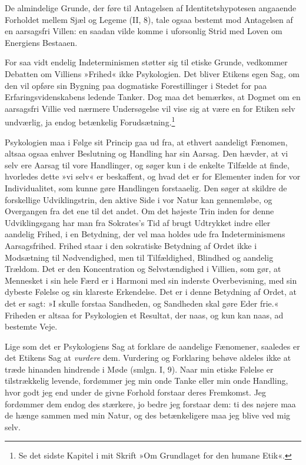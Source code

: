 \documentclass[12pt,a4paper,openany]{book}
\newcommand{\opage}[1]{\marginnote{\footnotesize\textit{[#1]}}}
\begin{document}
De almindelige Grunde, der føre til Antagelsen af Identitetshypotesen
angaaende Forholdet mellem Sjæl og Legeme (II, 8), tale ogsaa bestemt
mod Antagelsen af en aarsagsfri Villen: en saadan vilde komme i
uforsonlig Strid med Loven om Energiens Bestaaen.

For saa vidt endelig Indeterminismen støtter sig til etiske Grunde,
vedkommer Debatten om Villiens »Frihed« ikke Psykologien. Det bliver
Etikens egen Sag, om den vil opføre sin Bygning paa dogmatiske
Forestillinger i Stedet for paa Erfaringsvidenskabens ledende Tanker.
Dog maa det bemærkes, at Dogmet om en aarsagsfri Villie ved nærmere
Undersøgelse vil vise sig at være en for Etiken selv undværlig, ja endog
betænkelig Forudsætning.\footnote[1]{Se det sidste Kapitel i mit Skrift
»Om Grundlaget for den humane Etik«.}

Psykologien maa i Følge sit Princip gaa ud fra, at ethvert aandeligt
Fænomen, altsaa ogsaa enhver Beslutning og Handling har sin Aarsag. Den
hævder, at vi selv ere Aarsag til vore Handlinger, og søger kun i de
enkelte Tilfælde at finde, hvorledes dette »vi selv« er beskaffent, og
hvad det er for Elementer inden for vor Individualitet, som kunne gøre
Handlingen forstaaelig. Den søger at skildre de forskellige
Udviklingstrin, den aktive Side i vor Natur kan gennemløbe, og
Overgangen fra det ene til det andet. Om det højeste Trin inden for
denne Udviklingsgang har man fra Sokrates’s Tid
\opage{404}af brugt Udtrykket indre eller aandelig Frihed, i en
Betydning, der vel maa holdes ude fra Indeterminismens Aarsagsfrihed.
Frihed staar i den sokratiske Betydning af Ordet ikke i Modsætning til
Nødvendighed, men til Tilfældighed, Blindhed og aandelig Trældom. Det er
den Koncentration og Selvstændighed i Villien, som gør, at Mennesket i
sin hele Færd er i Harmoni med sin inderste Overbevisning, med sin
dybeste Følelse og sin klareste Erkendelse. Det er i denne Betydning af
Ordet, at det er sagt: »I skulle forstaa Sandheden, og Sandheden skal
gøre Eder frie.« Friheden er altsaa for Psykologien et Resultat, der
naas, og kun kan naas, ad bestemte Veje.

Lige som det er Psykologiens Sag at forklare de aandelige Fænomener,
saaledes er det Etikens Sag at \emph{vurdere} dem. Vurdering og
Forklaring behøve aldeles ikke at træde hinanden hindrende i Møde
(smlgn. I, 9). Naar min etiske Følelse er tilstrækkelig levende,
fordømmer jeg min onde Tanke eller min onde Handling, hvor godt jeg end
under de givne Forhold forstaar deres Fremkomst. Jeg fordømmer dem endog
des stærkere, jo bedre jeg forstaar dem: ti des nøjere maa de hænge
sammen med min Natur, og des betænkeligere maa jeg blive ved mig selv.
\end{document}
